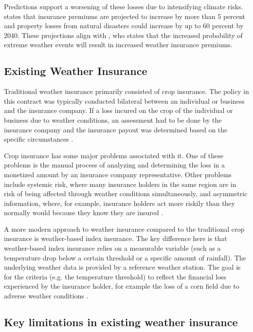 Predictions support a worsening of these losses due to intensifying climate risks. \autocite{cho2022climate} states that insurance premiums are projected to increase by more than 5 percent and property losses from natural disasters could increase by up to 60 percent by 2040. These projections align with \autocite{tucker1997climate}, who states that the increased probability of extreme weather events will result in increased weather insurance premiums. 


\subsection{Existing Weather Insurance}
Traditional weather insurance primarily consisted of crop insurance. The policy in this contract was typically conducted bilateral between an individual or business and the insurance company. If  a loss incured on the crop of the individual or business due to weather conditions, an assessment had to be done by the insurance company and the insurance payout was  determined based on the specific circumstances \autocite{michler2022risk}.

 Crop insurance has some major problems associated with it. One of these problems is the manual process of analyzing and determining the loss in a monetized amount by an insurance company representative. Other problems include systemic risk, where many insurance holders in the same region are in risk of being affected through weather conditions simultaneously, and asymmetric information, where, for example, insurance holders act more riskily than they normally would because they know they are insured \autocite{makki2002crop}.

 \sloppy A more modern approach to weather insurance compared to the traditional crop insurance is weather-based index insurance. The key difference here is that weather-based index insurance relies on a measurable variable (such as a temperature drop below a certain threshold or a specific amount of rainfall). The underlying weather data is provided by a reference weather station. The goal is for the criteria (e.g. the temperature threshold) to reflect the financial loss experienced by the insurance holder, for example the loss of a corn field due to adverse weather conditions \autocite{kajwang2022weather}.


 \subsection{Key limitations in existing weather insurance}\label{section:key_limitations_existing_insurance}
 
